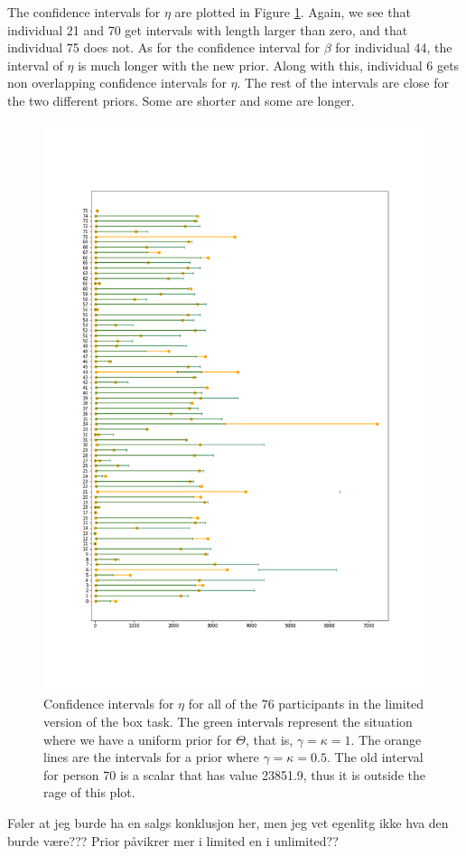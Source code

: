 The confidence intervals for $\eta$ are plotted in Figure \ref{fig:sensitivity_ci_lim_eta}. Again, we see that individual 21 and 70  get intervals with length larger than zero, and that individual 75 does not. As for the confidence interval for $\beta$ for individual 44, the interval of $\eta$ is much longer with the new prior. Along with this, individual 6 gets non overlapping confidence intervals for $\eta$. The rest of the intervals are close for the two different priors. Some are shorter and some are longer. 
\begin{figure}
    \centering
    \includegraphics[scale=0.37]{pictures/Sensitivity/ci_lim_eta_zoomed.png}
    \caption[CIs for $\eta$ for all participants with two different priors, limited]{Confidence intervals for $\eta$ for all of the 76 participants in the limited version of the box task. The green intervals represent the situation where we have a uniform prior for $\Theta$, that is, $\gamma=\kappa=1$. The orange lines are the intervals for a prior where $\gamma=\kappa=0.5$. The old interval for person 70 is a scalar that has value 23851.9, thus it is outside the rage of this plot.}
    \label{fig:sensitivity_ci_lim_eta}
\end{figure}


Føler at jeg burde ha en salgs konklusjon her, men jeg vet egenlitg ikke hva den burde være??? Prior påvikrer mer i limited en i unlimited??